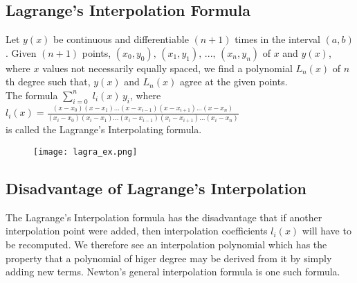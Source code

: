 \documentclass[aima203_lecturenotes_ku.tex]{subfiles}
\begin{document}
\subsection{Lagrange's Interpolation Formula}
Let $y(x)$ be continuous and differentiable $(n+1)$ times in the interval $(a,b)$. Given $(n+1)$ points, $(x_0,y_0), \, (x_1,y_1), \, ..., \, (x_n,y_n)$ of $x$ and $y(x)$, where $x$ values not necessarily equally spaced, we find a polynomial $L_n(x)$ of $n$th degree such that, $y(x)$ and $L_n(x)$ agree at the given points. \\
The formula $\sum_{i=0}^n \; l_i(x)\, y_i$, where $\displaystyle l_i(x) = \frac{(x-x_0)(x-x_1)...(x-x_{i-1})(x-x_{i+1})...(x-x_n)}{(x_i-x_0)(x_i-x_1)...(x_i-x_{i-1})(x_i-x_{i+1})...(x_i-x_n)} $ \\[2mm]  is called the Lagrange's Interpolating formula.

\begin{figure}[h]
  \centering
\texttt{[image: lagra\_ex.png]}
\end{figure}
\subsection{Disadvantage of Lagrange's Interpolation}
The Lagrange's Interpolation formula has the disadvantage that if another interpolation point were added, then interpolation coefficients $l_i(x)$ will have to be recomputed. We therefore see an interpolation polynomial which has the property that a polynomial of higer degree may be derived from it by simply adding new terms. Newton's general interpolation formula is one such formula.
\end{document}
